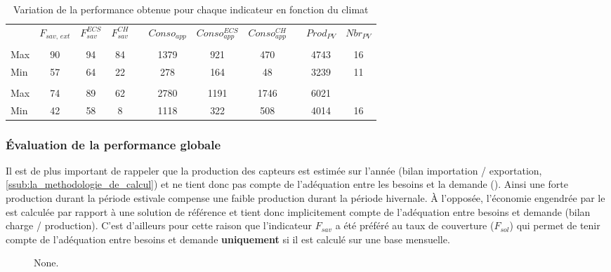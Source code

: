 \begin{table}
\centering
\caption[Performance maximale pouvant être obtenue pour différents indicateurs]
         {Variation de la performance obtenue pour chaque indicateur en fonction du climat}
\label{tab:bornes_front_pareto}
\begin{tabular}{L{2cm} c c c c c c c c c c}
    \toprule
                & $F_{sav,\,ext}$ & $F_{sav}^{ECS}$ & $F_{sav}^{CH}$ & & $Conso_{app}$ & $Conso_{app}^{ECS}$ & $Conso_{app}^{CH}$ & & $Prod_{PV}$ & $Nbr_{PV}$ \\
    \addlinespace
     \\
    \midrule
    Max & 90  & 94  & 84  &   & 1379  & 921 & 470 &   & 4743  & 16  \\
    Min & 57  & 64  & 22  &   & 278 & 164 & 48  &   & 3239  & 11  \\
    \addlinespace
     \\
    \midrule
    Max & 74  & 89  & 62  &   & 2780  & 1191  & 1746  &   & 6021  &   \\
    Min & 42  & 58  & 8 &   & 1118  & 322 & 508 &   & 4014  & 16  \\
    \bottomrule
\end{tabular}
\end{table}


\subsubsection{Évaluation de la performance globale} %
\label{ssub:evaluation_de_la_performance_globale}
Il est de plus important de rappeler que la production des capteurs  est estimée
sur l’année (bilan importation / exportation, \ref{ssub:la_methodologie_de_calcul}) et ne
tient donc pas compte de l’adéquation entre les besoins et la demande
(). Ainsi une forte production durant la période estivale
compense une faible production durant la période hivernale. À l’opposée, l’économie
engendrée par le  est calculée par rapport à une solution de référence et tient
donc implicitement compte de l’adéquation entre besoins et demande (bilan charge /
production). C’est d’ailleurs pour cette raison que l’indicateur $F_{sav}$ a été préféré
au taux de couverture ($F_{sol}$) qui permet de tenir compte de l’adéquation entre besoins
et demande \textbf{uniquement} si il est calculé sur une base mensuelle.

\begin{figure}
    \centering
    \caption[None]
             {None.}
    \label{fig:evolution_usages_pv}
\end{figure}


